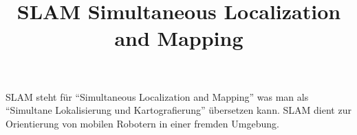 \documentclass{styles/llncs}
\title{SLAM Simultaneous Localization and Mapping}
\author{}
\institute{FH Aachen University of Applied Sciences}
\begin{document}
\maketitle

SLAM steht für "`Simultaneous Localization and Mapping"' was man als "`Simultane Lokalisierung und Kartografierung"' übersetzen kann.
SLAM dient zur Orientierung von mobilen Robotern in einer fremden Umgebung.
\end{document}
